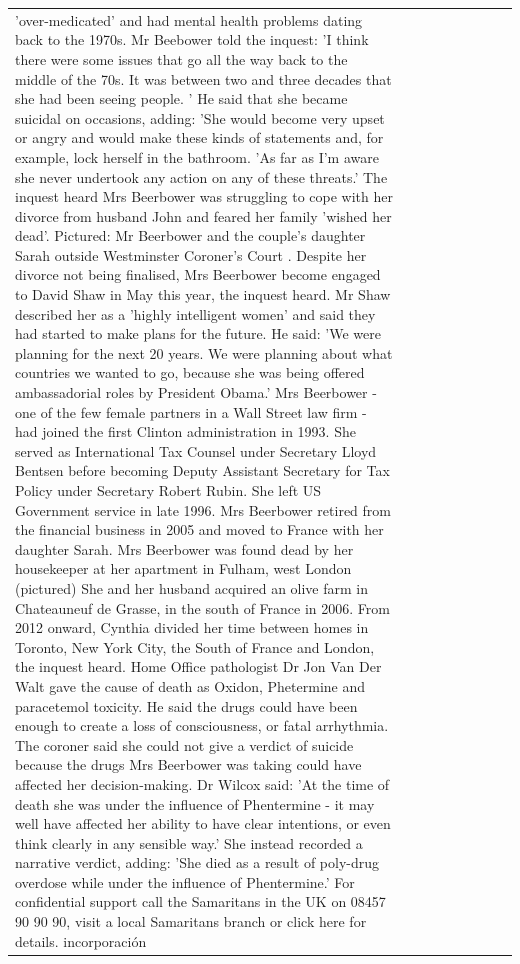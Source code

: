 \begin{table}[H]
\begin{tabular}{lllrlllll}
'over-medicated' and had mental health problems dating back to the 1970s. Mr Beebower told the inquest: 'I think there were some issues that go all the way back to the middle of the 70s. It was between two and three decades that she had been seeing people. ' He said that she became suicidal on occasions, adding: 'She would become very upset or angry and would make these kinds of statements and, for example, lock herself in the bathroom. 'As far as I'm aware she never undertook any action on any of these threats.' The inquest heard Mrs Beerbower was struggling to cope with her divorce from husband John and feared her family 'wished her dead'. Pictured: Mr Beerbower and the couple's daughter Sarah outside Westminster Coroner's Court . Despite her divorce not being finalised, Mrs Beerbower become engaged to David Shaw in May this year, the inquest heard. Mr Shaw described her as a 'highly intelligent women' and said they had started to make plans for the future. He said: 'We were planning for the next 20 years. We were planning about what countries we wanted to go, because she was being offered ambassadorial roles by President Obama.' Mrs Beerbower - one of the few female partners in a Wall Street law firm - had joined the first Clinton administration in 1993. She served as International Tax Counsel under Secretary Lloyd Bentsen before becoming Deputy Assistant Secretary for Tax Policy under Secretary Robert Rubin. She left US Government service in late 1996. Mrs Beerbower retired from the financial business in 2005 and moved to France with her daughter Sarah. Mrs Beerbower was found dead by her housekeeper at her apartment in Fulham, west London (pictured) She and her husband acquired an olive farm in Chateauneuf de Grasse, in the south of France in 2006. From 2012 onward, Cynthia divided her time between homes in Toronto, New York City, the South of France and London, the inquest heard. Home Office pathologist Dr Jon Van Der Walt gave the cause of death as Oxidon, Phetermine and paracetemol toxicity. He said the drugs could have been enough to create a loss of consciousness, or fatal arrhythmia. The coroner said she could not give a verdict of suicide because the drugs Mrs Beerbower was taking could have affected her decision-making. Dr Wilcox said: 'At the time of death she was under the influence of Phentermine - it may well have affected her ability to have clear intentions, or even think clearly in any sensible way.' She instead recorded a narrative verdict, adding: 'She died as a result of poly-drug overdose while under the influence of Phentermine.' For confidential support call the Samaritans in the UK on 08457 90 90 90, visit a local Samaritans branch or click here for details. incorporación \\

\end{tabular}
\end{table}
